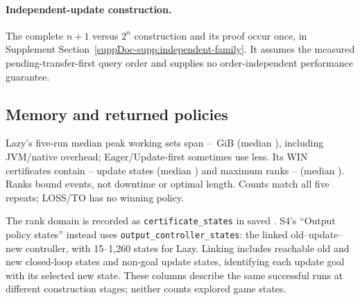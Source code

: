 \paragraph{Independent-update construction.}
The complete $n+1$ versus $2^n$ construction and its proof occur once, in Supplement Section~\ref{suppDoc-supp:independent-family}. It assumes the measured pending-transfer-first query order and supplies no order-independent performance guarantee.

\subsection{Memory and returned policies}\label{ta:memory_policies}
Lazy's five-run median peak working sets span \FixedLazyRSSMin{}--\FixedLazyRSSMax{}~GiB (median \FixedLazyRSSMedian{}), including JVM/native overhead; Eager/Update-first sometimes use less. Its \FixedPolicies{} WIN certificates contain \FixedPolicyStatesMin{}--\FixedPolicyStatesMax{} update states (median \FixedPolicyStatesMedian{}) and maximum ranks \FixedRankMin{}--\FixedRankMax{} (median \FixedRankMedian{}). Ranks bound events, not downtime or optimal length. Counts match all five repeats; LOSS/TO has no winning policy.

The rank domain is recorded as \texttt{certificate\_states} in saved . S4's ``Output policy states'' instead uses \texttt{output\_controller\_states}: the linked old--update--new controller, with 15--1,260 states for Lazy. Linking includes reachable old and new closed-loop states and non-goal update states, identifying each update goal with its selected new state. These columns describe the same successful runs at different construction stages; neither counts explored game states.

